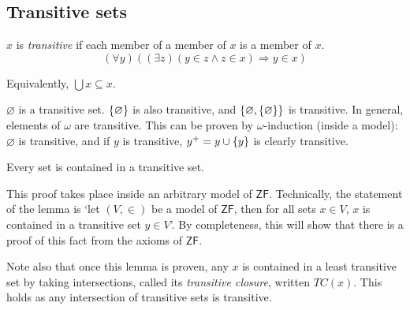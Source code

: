 \subsection{Transitive sets}
\begin{definition}
    \( x \) is \emph{transitive} if each member of a member of \( x \) is a member of \( x \).
    \[ (\forall y)((\exists z)(y \in z \wedge z \in x) \Rightarrow y \in x) \]
\end{definition}
Equivalently, \( \bigcup x \subseteq x \).
\begin{example}
    \( \varnothing \) is a transitive set.
    \( \qty{\varnothing} \) is also transitive, and \( \qty{\varnothing, \qty{\varnothing}} \) is transitive.
    In general, elements of \( \omega \) are transitive.
    This can be proven by \( \omega \)-induction (inside a model): \( \varnothing \) is transitive, and if \( y \) is transitive, \( y^+ = y \cup \qty{y} \) is clearly transitive.
\end{example}
\begin{lemma}
    Every set is contained in a transitive set.
\end{lemma}
\begin{remark}
    This proof takes place inside an arbitrary model of \( \mathsf{ZF} \).
    Technically, the statement of the lemma is `let \( (V, \in) \) be a model of \( \mathsf{ZF} \), then for all sets \( x \in V \), \( x \) is contained in a transitive set \( y \in V \)'.
    By completeness, this will show that there is a proof of this fact from the axioms of \( \mathsf{ZF} \).

    Note also that once this lemma is proven, any \( x \) is contained in a least transitive set by taking intersections, called its \emph{transitive closure}, written \( TC(x) \).
    This holds as any intersection of transitive sets is transitive.
\end{remark}
